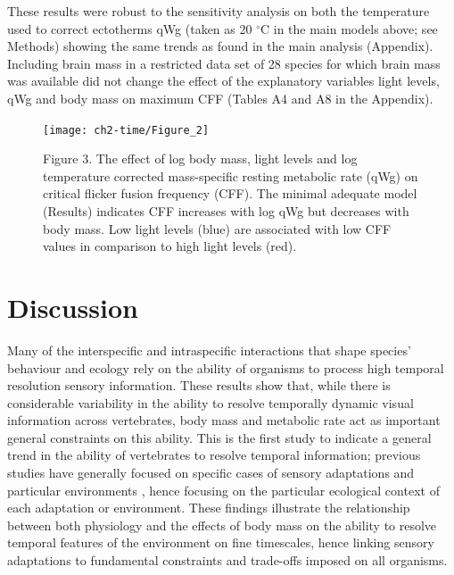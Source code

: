 These results were robust to the sensitivity analysis on both the temperature used to correct ectotherms qWg (taken as 20 $^{\circ}$C in the main models above; see Methods) showing the same trends as found in the main analysis (Appendix). Including brain mass in a restricted data set of 28 species for which brain mass was available did not change the effect of the explanatory variables light levels, qWg and body mass on maximum CFF (Tables A4 and A8 in the Appendix).


\begin{figure}[h!]
  \centering
  \texttt{[image: ch2-time/Figure\_2]}
  \caption*{Figure 3. The effect of  log body mass, light levels and log temperature corrected mass-specific resting metabolic rate (qWg) on critical flicker fusion frequency (CFF). The minimal adequate model (Results) indicates CFF increases with log qWg but decreases with body mass. Low light levels (blue) are associated with low CFF values in comparison to high light levels (red).}
  \label{fig:Figure 3.}
\end{figure}


\section{Discussion}
Many of the interspecific and intraspecific interactions that shape species' behaviour and ecology rely on the ability of organisms to process high temporal resolution sensory information. These results show that, while there is considerable variability in the ability to resolve temporally dynamic visual information across vertebrates, body mass and metabolic rate act as important general constraints on this ability. This is the first study to indicate a general trend in the ability of vertebrates to resolve temporal information; previous studies have generally focused on specific cases of sensory adaptations \citep{fritsches2005warm} and particular environments \citep{frank1999comparative,frank2012light}, hence focusing on the particular ecological context of each adaptation or environment. These findings illustrate the relationship between both physiology and the effects of body mass on the ability to resolve temporal features of the environment on fine timescales, hence linking sensory adaptations to fundamental constraints and trade-offs imposed on all organisms.


